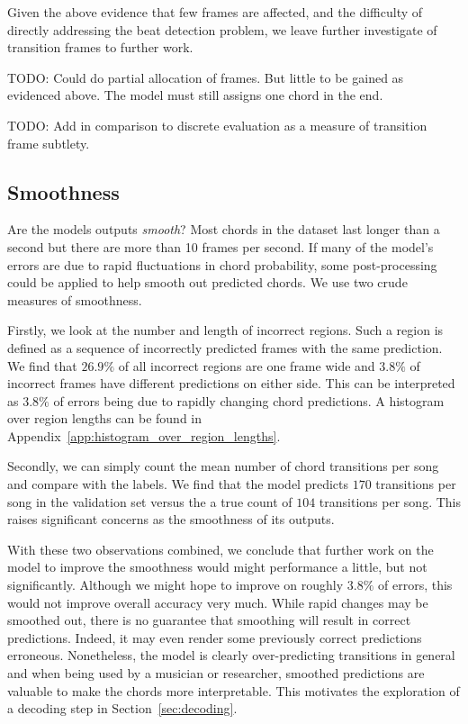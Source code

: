 Given the above evidence that few frames are affected, and the difficulty of directly addressing the beat detection problem, we leave further investigate of transition frames to further work.

TODO: Could do partial allocation of frames. But little to be gained as evidenced above. The model must still assigns one chord in the end.

TODO: Add in comparison to discrete evaluation as a measure of transition frame subtlety.


\subsection{Smoothness}\label{sec:smoothness}

Are the models outputs \emph{smooth}? Most chords in the dataset last longer than a second but there are more than 10 frames per second. If many of the model's errors are due to rapid fluctuations in chord probability, some post-processing could be applied to help smooth out predicted chords. We use two crude measures of smoothness.

Firstly, we look at the number and length of incorrect regions. Such a region is defined as a sequence of incorrectly predicted frames with the same prediction. We find that $26.9\%$ of all incorrect regions are one frame wide and $3.8\%$ of incorrect frames have different predictions on either side. This can be interpreted as $3.8\%$ of errors being due to rapidly changing chord predictions. A histogram over region lengths can be found in Appendix~\ref{app:histogram_over_region_lengths}.

Secondly, we can simply count the mean number of chord transitions per song and compare with the labels. We find that the model predicts $170$ transitions per song in the validation set versus the a true count of $104$ transitions per song. This raises significant concerns as the smoothness of its outputs. 

With these two observations combined, we conclude that further work on the model to improve the smoothness would might performance a little, but not significantly. Although we might hope to improve on roughly $3.8\%$ of errors, this would not improve overall accuracy very much. While rapid changes may be smoothed out, there is no guarantee that smoothing will result in correct predictions. Indeed, it may even render some previously correct predictions erroneous. Nonetheless, the model is clearly over-predicting transitions in general and when being used by a musician or researcher, smoothed predictions are valuable to make the chords more interpretable. This motivates the exploration of a decoding step in Section~\ref{sec:decoding}.

